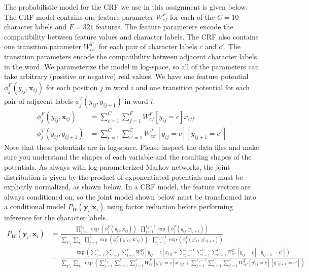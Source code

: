 \documentclass[11pt]{article}
\newcommand{\mbf}[1]{{\mathbf{#1}}}
\begin{document}
The probabilistic model for the CRF we use in this assignment is given below. The CRF model contains one feature parameter $W^F_{cf}$ for each of the $C=10$ character labels and $F=321$ features. The feature parameters encode the compatibility between feature values and character labels. The CRF also contains one transition parameter $W^T_{cc'}$ for each pair of character labels $c$ and $c'$.  The transition parameters encode the compatibility between adjacent character labels in the word. We parameterize the model in log-space, so all of the parameters can take arbitrary (positive or negative) real values. We have one feature potential
$\phi^F_j(y_{ij},\mbf{x}_{ij})$ for each position $j$ in word $i$ and one transition potential for each pair of adjacent labels $\phi^T_j(y_{ij},y_{ij+1})$ in word $i$.
%
\begin{align*}
\phi^F_j(y_{ij},\mbf{x}_{ij}) &= \sum_{c=1}^{C}\sum_{f=1}^F W^F_{cf}[y_{ij}=c]x_{ijf} \\
\phi^T_j(y_{ij},y_{ij+1}) &= \sum_{c=1}^{C}\sum_{c'=1}^{C}W^T_{cc'}[y_{ij}=c][y_{ij+1}=c']
\end{align*}
%
Note that these potentials are in log-space. Please inspect the data files and make sure you understand the shapes of each variable and the resulting shapes of the potentials. As always with log-parameterized Markov networks, the joint distribution is given by the product of exponentiated
potentials and must be explicitly normalized, as shown below. In a CRF model, the feature vectors are always conditioned on, so the joint model shown below must be transformed into a conditional model $P_{W}(\mbf{y}_i|\mbf{x}_i)$ using factor reduction before performing inference for the character labels.
%
\begin{align*}
P_{W}(\mbf{y}_i,\mbf{x}_i)
&=\frac{\displaystyle\prod_{j=1}^{L_i}\exp(\phi^F_j(y_{ij},\mbf{x}_{ij})) \cdot \prod_{j=1}^{L_i-1}\exp(\phi^T_j(y_{ij},y_{ij+1}))}
       {\displaystyle
         \sum_{\mbf{y}'_i}\sum_{\mbf{x}'_i}\prod_{j=1}^{L_i}\exp(\phi^F_j(y'_{ij},\mbf{x}'_{ij})) \cdot \prod_{j=1}^{L_i-1}\exp(\phi^T_j(y'_{ij},y'_{ij+1}))}\\
&= \frac{\displaystyle
     \exp\left(\sum_{j=1}^{L_i}\sum_{c=1}^{C}\sum_{f=1}^F W^F_{cf}[y_{ij}=c]x_{ijf}
     +\sum_{j=1}^{L_i-1}\sum_{c=1}^{C}\sum_{c'=1}^{C}W^T_{cc'}[y_{ij}=c][y_{ij+1}=c']\right)
   }
   {\displaystyle
     \sum_{\mbf{y}'_i}\sum_{\mbf{x}'_i}\exp\left(\sum_{j=1}^{L_i}\sum_{c=1}^{C}\sum_{f=1}^F
     W^F_{cf}[y'_{ij}=c]x'_{ijf}
     +\sum_{j=1}^{L_i-1}\sum_{c=1}^{C}\sum_{c'=1}^{C}W^T_{cc'}[y'_{ij}=c][y'_{ij+1}=c']\right)
   }
\end{align*}
\end{document}
